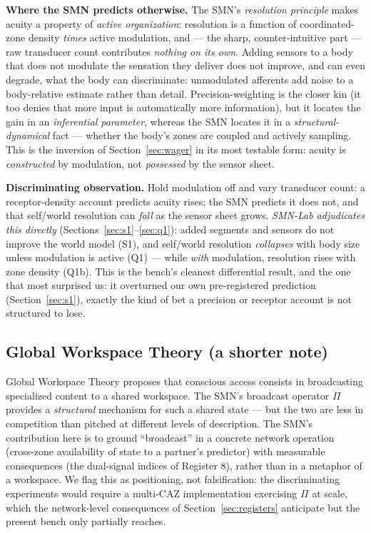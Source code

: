 \documentclass[utf8]{FrontiersinHarvard} %
\begin{document}
\textbf{Where the SMN predicts otherwise.} The SMN's \emph{resolution principle} makes acuity a property of \emph{active organization}: resolution is a function of coordinated-zone density \emph{times} active modulation, and --- the sharp, counter-intuitive part --- raw transducer count contributes \emph{nothing on its own}. Adding sensors to a body that does not modulate the sensation they deliver does not improve, and can even degrade, what the body can discriminate: unmodulated afferents add noise to a body-relative estimate rather than detail. Precision-weighting is the closer kin (it too denies that more input is automatically more information), but it locates the gain in an \emph{inferential parameter}, whereas the SMN locates it in a \emph{structural-dynamical} fact --- whether the body's zones are coupled and actively sampling. This is the inversion of Section~\ref{sec:wager} in its most testable form: acuity is \emph{constructed} by modulation, not \emph{possessed} by the sensor sheet.

\textbf{Discriminating observation.} Hold modulation off and vary transducer count: a receptor-density account predicts acuity rises; the SMN predicts it does not, and that self/world resolution can \emph{fall} as the sensor sheet grows. \emph{SMN-Lab adjudicates this directly} (Sections~\ref{sec:s1}--\ref{sec:q1}): added segments and sensors do not improve the world model (S1), and self/world resolution \emph{collapses} with body size unless modulation is active (Q1) --- while \emph{with} modulation, resolution rises with zone density (Q1b). This is the bench's cleanest differential result, and the one that most surprised us: it overturned our own pre-registered prediction (Section~\ref{sec:s1}), exactly the kind of bet a precision or receptor account is not structured to lose.

\subsection{Global Workspace Theory (a shorter note)}\label{sec:gwt}
Global Workspace Theory \citep{Baars2005GlobalWorkspace,Dehaene2014Consciousness} proposes that conscious access consists in broadcasting specialized content to a shared workspace. The SMN's broadcast operator $\Pi$ provides a \emph{structural} mechanism for such a shared state --- but the two are less in competition than pitched at different levels of description. The SMN's contribution here is to ground ``broadcast'' in a concrete network operation (cross-zone availability of state to a partner's predictor) with measurable consequences (the dual-signal indices of Register 8), rather than in a metaphor of a workspace. We flag this as positioning, not falsification: the discriminating experiments would require a multi-CAZ implementation exercising $\Pi$ at scale, which the network-level consequences of Section~\ref{sec:registers} anticipate but the present bench only partially reaches.
\end{document}
